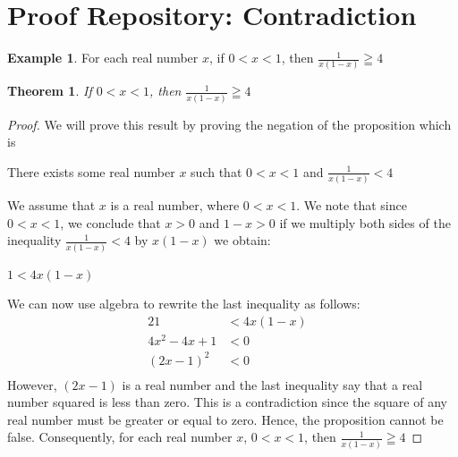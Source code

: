 \documentclass{book}
\newtheorem{theorem}{Theorem}[section]
\theoremstyle{definition}
\newtheorem{example}{Example}[definition]
\theoremstyle{remark}
\begin{document}
\section{Proof Repository: Contradiction}
\begin{example}
For each real number $x$, if $0 < x < 1$, then $\frac{1}{x(1-x)} \geqq 4$

\begin{tcolorbox}
	\begin{theorem}
	\label{the2}		
		If $0 < x < 1$, then $\frac{1}{x(1-x)} \geqq 4$
	\end{theorem}
\end{tcolorbox}

\begin{proof}

We will prove this result by proving the negation of the proposition which is
	\begin{center}
		There exists some real number $x$ such that $0 < x < 1$ and $\frac{1}{x(1-x)} < 4$
	\end{center}

We assume that $x$ is a real number, where $0 < x < 1$. We note that since $0 < x < 1$, we conclude that $x > 0$ and $1-x > 0$ if we multiply both sides of the inequality $\frac{1}{x(1-x)} < 4$ by $x(1-x)$ we obtain: 
	\begin{center}
		$1 < 4x(1-x)$
	\end{center}
We can now use algebra to rewrite the last inequality as follows: 
	\begin{alignat*}{2}
		1 				&< 4x(1-x)& \\
		4x^2 - 4x + 1 	&< 0& \\
		(2x - 1)^2 		&< 0& \\
	\end{alignat*} 
However, $(2x - 1)$ is a real number and the last inequality say that a real number squared is less than zero. This is a contradiction since the square of any real number must be greater or equal to zero. Hence, the proposition cannot be false. Consequently, for each real number $x$, $0 < x < 1$, then $\frac{1}{x(1-x)} \geqq 4$

\end{proof}
\end{example}
\end{document}

